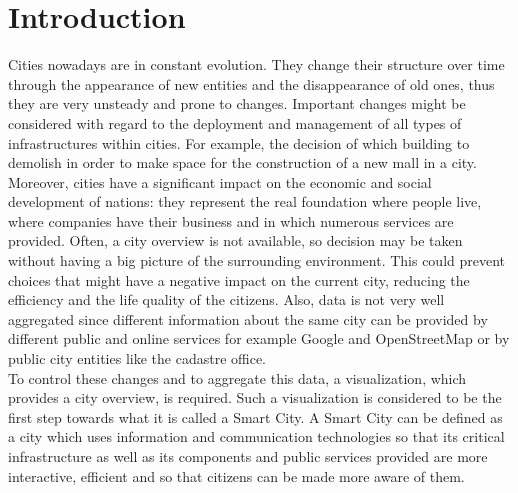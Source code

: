 \section{Introduction} \label{introduction}
Cities nowadays are in constant evolution. They change their structure over time through the appearance of new entities and the disappearance of old ones, thus they are very unsteady and prone to changes. Important changes might be considered with regard to the deployment and management of all types of infrastructures within cities. For example, the decision of which building to demolish in order to make space for the construction of a new mall in a city.\\

Moreover, cities have a significant impact on the economic and social development of nations: they represent the real foundation where people live, where companies have their business and in which numerous services are provided. Often, a city overview is not available, so decision may be taken without having a big picture of the surrounding environment. This could prevent choices that might have a negative impact on the current city, reducing the efficiency and the life quality of the citizens. Also, data is not very well aggregated since different information about the same city can be provided by different public and online services for example Google and OpenStreetMap or by public city entities like the cadastre office.\\

To control these changes and to aggregate this data, a visualization, which provides a city overview, is required. Such a visualization is considered to be the first step towards what it is called a Smart City. A Smart City can be defined as a city which uses information and communication technologies so that its critical infrastructure as well as its components and public services provided are more interactive, efficient and so that citizens can be made more aware of them.\\

